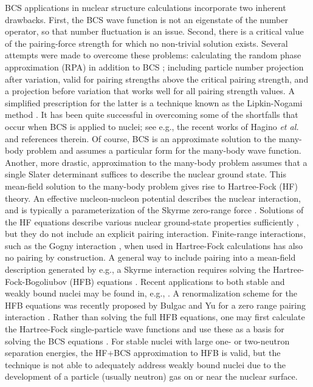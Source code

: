 \documentclass[rmp,aps,floatfix]{revtex4}
\begin{document}
BCS applications in nuclear structure calculations 
incorporate two inherent drawbacks. First, the BCS
wave function is not an eigenstate of the number operator, so that number
fluctuation is an issue. Second, there is a critical value
of the pairing-force strength for which no non-trivial solution exists. 
Several attempts were made to overcome these problems:
calculating the random phase approximation (RPA) in addition 
to BCS \cite{uw}; including particle number projection \cite{klm} 
after variation, valid 
for pairing strengths above the critical pairing strength, 
and a projection before variation that works well for all pairing strength 
values. A simplified prescription for the latter 
is a technique known as the Lipkin-Nogami method 
\cite{lipkin,nogami}. It has been quite successful in overcoming 
some of the shortfalls that
occur when BCS is applied to nuclei; see e.g., the recent works of Hagino 
{\em et al.}  \cite{hagino2000,hagino2002} and references therein. 
Of course, BCS is an approximate solution to the many-body problem
and assumes a particular form for the many-body wave function. Another,
more drastic, approximation to the many-body problem 
assumes that a single Slater determinant
suffices to describe the nuclear ground state. This mean-field 
solution to the many-body problem gives rise to 
Hartree-Fock (HF) theory. An effective nucleon-nucleon 
potential describes the nuclear interaction, and is
typically a 
parameterization of the Skyrme zero-range force \cite{sk_56,sk_59,vb_70,vb_72}.
Solutions of the HF equations 
describe various nuclear ground-state properties sufficiently \cite{qf_78}, 
but they do not include an explicit pairing interaction. 
Finite-range interactions, such as
the Gogny interaction \cite{dgg_75}, when used in Hartree-Fock calculations
has also no pairing by construction. 
A general way to include pairing into a mean-field 
description generated by e.g., a Skyrme interaction requires solving the 
Hartree-Fock-Bogoliubov (HFB) equations \cite{bog_58}. Recent
applications to both stable and weakly bound nuclei
may be found in, e.g., \cite{dob_96,heenen_2002b,heenen_2002a}. 
A renormalization scheme for the HFB equations 
was recently proposed by Bulgac and Yu for a zero range pairing interaction
\cite{aurel2001a,aurel2001b}.  
Rather than solving the full HFB equations, one may first
calculate the Hartree-Fock single-particle wave functions and
use these as a basis for solving the BCS equations \cite{tondeur_79,
nayak_95}.  
For stable nuclei with large one- or two-neutron 
separation energies, the HF+BCS approximation to HFB is valid, but
the technique is not able to adequately address weakly bound nuclei
due to the development of a particle (usually neutron) gas on or
near the nuclear surface. 
\end{document}
